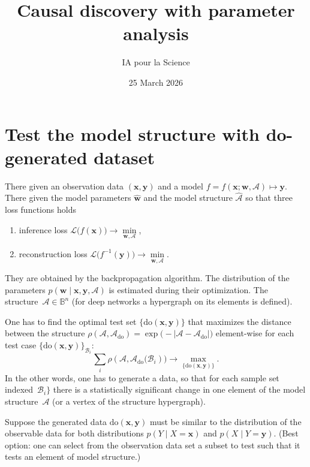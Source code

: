 \documentclass[12pt]{article}
\title{Causal discovery with parameter analysis}
\author{IA pour la Science}
\date{25 March 2026}
\newcommand{\doc}{\mathrm{do}}
\newcommand{\bx}{\mathbf{x}}
\newcommand{\bw}{\mathbf{w}}
\newcommand{\by}{\mathbf{y}}
\newcommand{\cA}{\mathcal{A}}
\newcommand{\cB}{\mathcal{B}}
\newcommand{\loss}{\mathcal{L}}
\begin{document}
\section*{Test the model structure with do-generated dataset}
There given an observation data $(\bx,\by)$ and a model $f=f(\bx; \bw, \cA)\mapsto \by$.
There given the model parameters $\hat{\bw}$ and the model structure $\hat{\cA}$  so that three loss functions holds
\begin{enumerate}[1)]
\item inference loss $\loss\bigl(f(\bx)\bigr)\to \mathop{\min}\limits_{\bw,\cA}$,
\item reconstruction loss  $\loss\bigl(f^{-1}(\by)\bigr)\to \mathop{\min}\limits_{\bw,\cA}$.
\end{enumerate}
They are obtained by the backpropagation algorithm. The distribution of the parameters $p(\bw\mid \bx,\by,\cA)$ is estimated during their optimization. The structure~$\cA\in\mathbb{B}^n$ (for deep networks a hypergraph on its elements is defined). 

\medskip
One has to find the optimal test set $\{\doc(\bx,\by)\}$ that maximizes the distance between the structure $\rho(\cA,\cA_\doc) = \exp\bigl(-|\cA-\cA_\doc|\bigr)$ element-wise for each test case $\{\doc(\bx,\by)\}_{\cB_i}$:
\[
\sum\limits_{i}\rho(\cA,\cA_\doc\bigl(\cB_i)\bigr) \to\mathop{\max}\limits_{\{\doc(\bx,\by)\}}.
\]
In the other words, one has to generate a data, so that for each sample set indexed~$\cB_i\}$ there is a statistically significant change in one element of the model structure~$\cA$ (or a vertex of the structure hypergraph).

Suppose the generated data $\doc(\bx,\by)$ must be similar to the distribution of the observable data for both distributions 
$p(Y\mid X=\bx)$ and $p(X\mid Y=\by)$. (Best option: one can select from the observation data set a subset to test such that it tests an element of model structure.)
\end{document}
